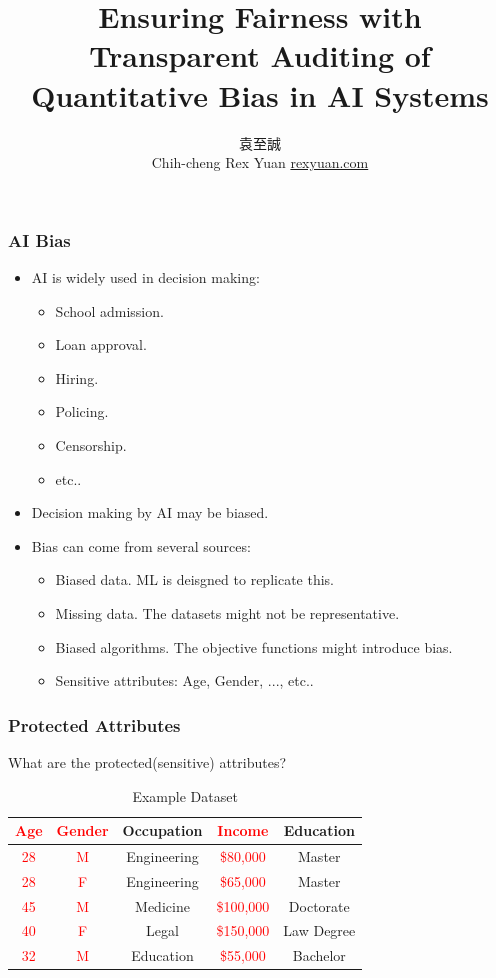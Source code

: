 \documentclass{beamer}
\date{\displaydate{date}}
\title[AI Fairness]{Ensuring Fairness with Transparent Auditing of
Quantitative Bias in AI Systems}
\author[Rex]{
    \begin{CJK}{UTF8}{bsmi}袁至誠\end{CJK}\newline
    Chih-cheng Rex Yuan\newline
    \href{https://rexyuan.com/}{rexyuan.com}
    }
\institute[IIS,AS]{Institute of Information Science, Academia Sinica}
\newcommand{\red}[1]{\textcolor{red}{#1}}
\begin{document}
\begin{frame}
\titlepage
\end{frame}

\begin{frame}
    \frametitle{AI Bias}
    \begin{itemize}
        \item AI is widely used in decision making:
        \begin{itemize}
            \item School admission.
            \item Loan approval.
            \item Hiring.
            \item Policing.
            \item Censorship.
            \item etc..
        \end{itemize}
        \item Decision making by AI may be biased.
        \item Bias can come from several sources:
        \begin{itemize}
            \item Biased data. ML is deisgned to replicate this.
            \item Missing data. The datasets might not be representative.
            \item Biased algorithms. The objective functions might introduce bias.
            \item Sensitive attributes: Age, Gender, ..., etc..
        \end{itemize}
    \end{itemize}
\end{frame}

\begin{frame}
    \frametitle{Protected Attributes}
    What are the protected(sensitive) attributes?
    \begin{table}
        \begin{tabular}{|c|c|c|c|c|}
            \hline
            \red{Age} & \red{Gender} & Occupation & \red{Income} & Education \\
            \hline
            \red{28} & \red{M} & Engineering & \red{\$80,000} & Master \\
            \red{28} & \red{F} & Engineering & \red{\$65,000} & Master \\
            \red{45} & \red{M} & Medicine    & \red{\$100,000} & Doctorate \\
            \red{40} & \red{F} & Legal       & \red{\$150,000} & Law Degree \\
            \red{32} & \red{M} & Education   & \red{\$55,000} & Bachelor \\
            \hline
        \end{tabular}
        \caption{Example Dataset}
    \end{table}
\end{frame}
\end{document}
